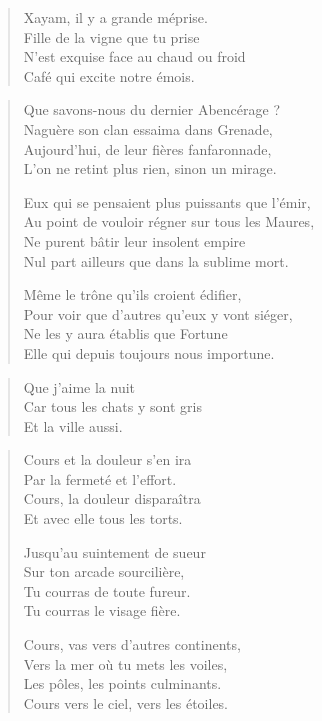 \begin{verse}
Xayam\label{foot.xayam}, il y a grande méprise.\\
Fille de la vigne que tu prise\\
N’est exquise face au chaud ou froid\\
Café qui excite notre émois.
\end{verse}

\begin{verse}
Que savons-nous du dernier Abencérage ?\\
Naguère son clan essaima dans Grenade,\\
Aujourd’hui, de leur fières fanfaronnade,\\
L’on ne retint plus rien, sinon un mirage.

Eux qui se pensaient plus puissants que l’émir,\\
Au point de vouloir régner sur tous les Maures,\\
Ne purent bâtir leur insolent empire\\
Nul part ailleurs que dans la sublime mort.

Même le trône qu’ils croient édifier,\\
Pour voir que d’autres qu’eux y vont siéger,\\
Ne les y aura établis que Fortune\\
Elle qui depuis toujours nous importune.
\end{verse}

\begin{verse}
Que j’aime la nuit\\
Car tous les chats y sont gris\\
Et la ville aussi.
\end{verse}

\begin{verse}
Cours et la douleur s’en ira\\
Par la fermeté et l’effort.\\
Cours, la douleur disparaîtra\\
Et avec elle tous les torts.

Jusqu’au suintement de sueur\\
Sur ton arcade sourcilière,\\
Tu courras de toute fureur.\\
Tu courras le visage fière.

Cours, vas vers d’autres continents,\\
Vers la mer où tu mets les voiles,\\
Les pôles, les points culminants.\\
Cours vers le ciel, vers les étoiles.
\end{verse}

